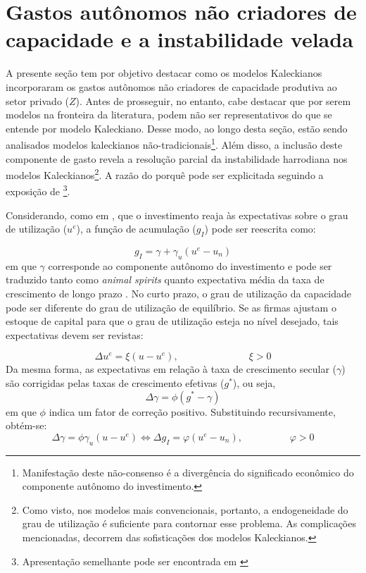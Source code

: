 

\section{Gastos autônomos não criadores de capacidade e a instabilidade velada}\label{Literatura}

A presente seção tem por objetivo destacar como os modelos Kaleckianos incorporaram os gastos autônomos não criadores de capacidade produtiva ao setor privado ($Z$). Antes de prosseguir, no entanto, cabe destacar que por serem modelos na fronteira da literatura, podem não ser representativos do que se entende por modelo Kaleckiano. Desse modo, ao longo desta seção, estão sendo analisados modelos kaleckianos não-tradicionais\footnote{Manifestação deste não-consenso é a divergência do significado econômico do componente autônomo do investimento.}. Além disso, a inclusão deste componente de gasto revela a resolução parcial da instabilidade harrodiana nos modelos Kaleckianos\footnote{Como visto, nos modelos mais convencionais, portanto, a endogeneidade do grau de utilização é suficiente para contornar esse problema. As complicações mencionadas, decorrem das sofisticações dos modelos Kaleckianos.}. A razão do porquê pode ser explicitada seguindo a exposição de \textcite{hein_harrodian_2012}\footnote{Apresentação semelhante pode ser encontrada em \textcite{allain_macroeconomic_2014}}. 

Considerando, como em \textcite{amadeo_role_1986}, que o investimento reaja às expectativas sobre o grau de utilização ($u^e$), a função de acumulação ($g_I$) pode ser reescrita como:

\begin{equation}
\label{Kalecki_Autonomous}
g_I = \gamma + \gamma_u (u^e - u_n)
\end{equation}
em que $\gamma$ corresponde ao componente autônomo do investimento e pode ser traduzido tanto como \textit{animal spirits} quanto expectativa média da taxa de crescimento de longo prazo \cite[p.~4]{allain_macroeconomic_2014}.
No curto prazo, o grau de utilização da capacidade pode ser diferente do grau de utilização de equilíbrio. Se as firmas ajustam o estoque de capital para que o grau de utilização esteja no nível desejado, tais expectativas devem ser revistas:

\begin{equation}
\Delta u^e = \xi (u - u^e), \hspace{3cm} \xi > 0
\end{equation}
Da mesma forma, as expectativas em relação à taxa de crescimento secular ($\gamma$) são corrigidas pelas taxas de crescimento efetivas ($g^*$), ou seja, 
\begin{equation}
    \Delta \gamma = \phi (g^* - \gamma)
\end{equation}
em que $\phi$ indica um fator de correção positivo. Substituindo recursivamente, obtém-se:
\begin{equation}
    \Delta \gamma = \phi \gamma_u (u - u^e) \Leftrightarrow \Delta g_I = \varphi (u^e - u_n), \hspace{2cm} \varphi > 0
\end{equation}

